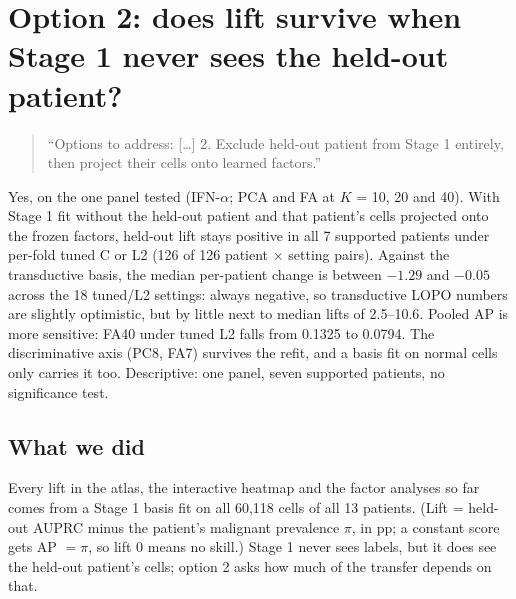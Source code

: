 \section{Option 2: does lift survive when Stage 1 never sees the held-out patient?}

\begin{quote}
``Options to address: [\ldots] 2. Exclude held-out patient from Stage 1 entirely, then project their cells onto learned factors.''
\end{quote}

\begin{answerbox}
Yes, on the one panel tested (IFN-$\alpha$; PCA and FA at $K$ = 10, 20 and 40). With Stage 1 fit without the held-out patient and that patient's cells projected onto the frozen factors, held-out lift stays positive in all 7 supported patients under per-fold tuned C or L2 (126 of 126 patient $\times$ setting pairs). Against the transductive basis, the median per-patient change is between $-1.29$ and $-0.05$\pp{} across the 18 tuned/L2 settings: always negative, so transductive LOPO numbers are slightly optimistic, but by little next to median lifts of 2.5--10.6\pp. Pooled AP is more sensitive: FA40 under tuned L2 falls from 0.1325 to 0.0794. The discriminative axis (PC8, FA7) survives the refit, and a basis fit on normal cells only carries it too. Descriptive: one panel, seven supported patients, no significance test.
\end{answerbox}

\subsection*{What we did}

Every lift in the atlas, the interactive heatmap and the factor analyses so far comes from a Stage 1 basis fit on all 60,118 cells of all 13 patients. (Lift = held-out AUPRC minus the patient's malignant prevalence $\pi$, in pp; a constant score gets AP $= \pi$, so lift 0 means no skill.) Stage 1 never sees labels, but it does see the held-out patient's cells; option 2 asks how much of the transfer depends on that.

